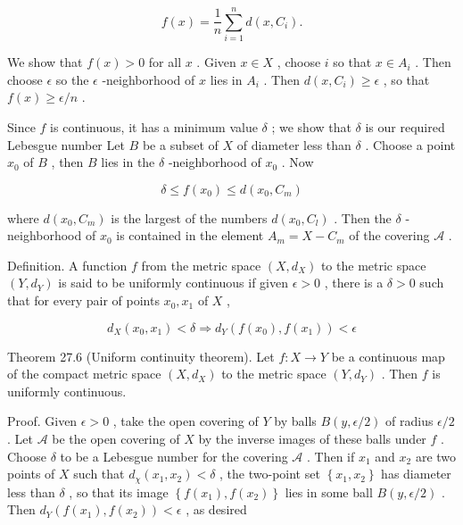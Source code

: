 \[
f\left( x\right)  = \frac{1}{n}\mathop{\sum }\limits_{{i = 1}}^{n}d\left( {x,{C}_{i}}\right) .
\]

We show that \(f\left( x\right)  > 0\) for all \(x\) . Given \(x \in  X\) , choose \(i\) so that \(x \in  {A}_{i}\) . Then choose \(\epsilon\) so the \(\epsilon\) -neighborhood of \(x\) lies in \({A}_{i}\) . Then \(d\left( {x,{C}_{i}}\right)  \geq  \epsilon\) , so that \(f\left( x\right)  \geq  \epsilon /n\) .

Since \(f\) is continuous, it has a minimum value \(\delta\) ; we show that \(\delta\) is our required Lebesgue number Let \(B\) be a subset of \(X\) of diameter less than \(\delta\) . Choose a point \({x}_{0}\) of \(B\) , then \(B\) lies in the \(\delta\) -neighborhood of \({x}_{0}\) . Now

\[
\delta  \leq  f\left( {x}_{0}\right)  \leq  d\left( {{x}_{0},{C}_{m}}\right)
\]

where \(d\left( {{x}_{0},{C}_{m}}\right)\) is the largest of the numbers \(d\left( {{x}_{0},{C}_{l}}\right)\) . Then the \(\delta\) -neighborhood of \({x}_{0}\) is contained in the element \({A}_{m} = X - {C}_{m}\) of the covering \(\mathcal{A}\) .

Definition. A function \(f\) from the metric space \(\left( {X,{d}_{X}}\right)\) to the metric space \(\left( {Y,{d}_{Y}}\right)\) is said to be uniformly continuous if given \(\epsilon  > 0\) , there is a \(\delta  > 0\) such that for every pair of points \({x}_{0},{x}_{1}\) of \(X\) ,

\[
{d}_{X}\left( {{x}_{0},{x}_{1}}\right)  < \delta  \Rightarrow  {d}_{Y}\left( {f\left( {x}_{0}\right) ,f\left( {x}_{1}\right) }\right)  < \epsilon
\]

Theorem 27.6 (Uniform continuity theorem). Let \(f : X \rightarrow  Y\) be a continuous map of the compact metric space \(\left( {X,{d}_{X}}\right)\) to the metric space \(\left( {Y,{d}_{Y}}\right)\) . Then \(f\) is uniformly continuous.

Proof. Given \(\epsilon  > 0\) , take the open covering of \(Y\) by balls \(B\left( {y,\epsilon /2}\right)\) of radius \(\epsilon /2\) . Let \(\mathcal{A}\) be the open covering of \(X\) by the inverse images of these balls under \(f\) . Choose \(\delta\) to be a Lebesgue number for the covering \(\mathcal{A}\) . Then if \({x}_{1}\) and \({x}_{2}\) are two points of \(X\) such that \({d}_{\chi }\left( {{x}_{1},{x}_{2}}\right)  < \delta\) , the two-point set \(\left\{  {{x}_{1},{x}_{2}}\right\}\) has diameter less than \(\delta\) , so that its image \(\left\{  {f\left( {x}_{1}\right) ,f\left( {x}_{2}\right) }\right\}\) lies in some ball \(B\left( {y,\epsilon /2}\right)\) . Then \({d}_{Y}\left( {f\left( {x}_{1}\right) ,f\left( {x}_{2}\right) }\right)  < \epsilon\) , as desired


